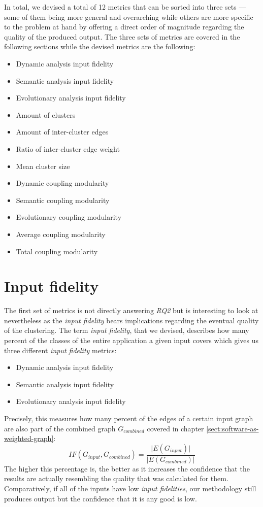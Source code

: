\documentclass[12pt,a4paper]{report}
\begin{document}
In total, we devised a total of 12 metrics that can be sorted into three sets ---
some of them being more general and overarching while others are more specific
to the problem at hand by offering a direct order of magnitude regarding the
quality of the produced output. The three sets of metrics are covered
in the following sections while the devised metrics are the following:
\begin{itemize}
  \item Dynamic analysis input fidelity
  \item Semantic analysis input fidelity
  \item Evolutionary analysis input fidelity
  \item Amount of clusters
  \item Amount of inter-cluster edges
  \item Ratio of inter-cluster edge weight
  \item Mean cluster size
  \item Dynamic coupling modularity
  \item Semantic coupling modularity
  \item Evolutionary coupling modularity
  \item Average coupling modularity
  \item Total coupling modularity
\end{itemize}



\section{Input fidelity} \label{sect:input-fidelity-metrics}

The first set of metrics is not directly answering \textit{RQ2} but is interesting
to look at nevertheless as the \textit{input fidelity} bears implications
regarding the eventual quality of the clustering.
The term \textit{input fidelity}, that we devised, describes how many percent
of the classes of the entire application a given input covers which gives us
three different \textit{input fidelity} metrics:
\begin{itemize}[noitemsep]
  \item Dynamic analysis input fidelity
  \item Semantic analysis input fidelity
  \item Evolutionary analysis input fidelity
\end{itemize}

Precisely, this measures how many percent of the edges of a certain input graph
are also part of the combined graph \(G_{combined}\) covered in chapter
\ref{sect:software-as-weighted-graph}:
\[
  IF(G_{input}, G_{combined}) = \frac{\vert E(G_{input}) \vert}{\vert E(G_{combined}) \vert}
\]
The higher this percentage is, the better as it increases the confidence
that the results are actually resembling the quality that was calculated for them.
Comparatively, if all of the inputs have low \textit{input fidelities},
our methodology still produces output but the confidence that it is any good is low.
\end{document}
